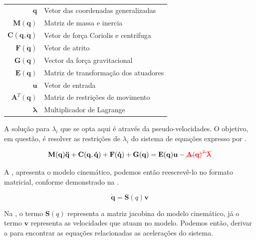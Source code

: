 \begin{center}
    \begin{tabular}{ r | l }
        $\mathbf{q}$               & Vetor das coordenadas generalizadas   \\
        $\mathbf{M(q)}$            & Matriz de massa e inercia             \\
        $\mathbf{C(q, \dot{q})}$   & Vetor de força Coriolis e centrifuga  \\
        $\mathbf{F(\dot{q})}$      & Vetor de atrito                       \\
        $\mathbf{G(q)}$            & Vector da força gravitacional         \\
        $\mathbf{E(q)}$            & Matriz de transformação dos atuadores \\
        $\mathbf{u}$               & Vetor de entrada                      \\
        $\mathbf{A}^T\mathbf{(q)}$ & Matriz de restrições de movimento     \\
        $\boldsymbol{\lambda}$     & Multiplicador de Lagrange             \\
    \end{tabular}
\end{center}

A solução para $\lambda_i$ que se opta aqui é através da pseudo-velocidades. O objetivo, em questão, é resolver as restrições de $\lambda_i$ do 
sistema de equações expresso por .

\begin{equation}
    \mathbf{M(q)\ddot{q}+ C(q, \dot{q})+ F(\dot{q})+G(q) = E(q)u} - \textcolor{red}{\cancel{\mathbf{A}\mathbf{(q)}^T\boldsymbol{\lambda}}}
    \label{eq:rmrestri}
\end{equation}

A , apresenta o modelo cinemático, podemos então reescrevê-lo no formato matricial, conforme demonstrado na .

\begin{equation}
    \mathbf{\dot{q}} = \mathbf{S}(q)\mathbf{v}
    \label{eq:modcinematicomat}
\end{equation}

Na , o termo $\mathbf{S}(q)$ representa a matriz jacobina do modelo cinemático, já o termo $\mathbf{v}$ representa as velocidades 
que atuam no modelo. Podemos então, derivar a  para encontrar as equações relacionadas as acelerações do sistema.

